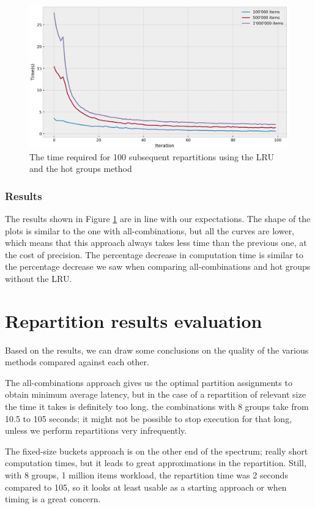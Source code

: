 \begin{figure}[!htb]
  \centering
  \includegraphics[width=\textwidth,height=\textheight,keepaspectratio]{img/LRU_8_hot.png}
  \caption{The time required for 100 subsequent repartitions using the LRU and the hot groups method}
  \label{fig:LRU_8_hot}
\end{figure}

\subsubsection{Results}
The results shown in Figure \ref{fig:LRU_8_hot} are in line with our expectations. The shape of the plots is similar to the one with all-combinations, but all the curves are lower, which means that this approach always takes less time than the previous one, at the cost of precision. The percentage decrease in computation time is similar to the percentage decrease we saw when comparing all-combinations and hot groups without the LRU. 

\section{Repartition results evaluation}\label{sec:repartition-results-evaluation}
Based on the results, we can draw some conclusions on the quality of the various methods compared against each other. 

The all-combinations approach gives us the optimal partition assignments to obtain minimum average latency, but in the case of a repartition of relevant size the time it takes is definitely too long. the combinations with 8 groups take from 10.5 to 105 seconds; it might not be possible to stop execution for that long, unless we perform repartitions very infrequently.

The fixed-size buckets approach is on the other end of the spectrum; really short computation times, but it leads to great approximations in the repartition. Still, with 8 groups, 1 million items workload, the repartition time was 2 seconds compared to 105, so it looks at least usable as a starting approach or when timing is a great concern.

